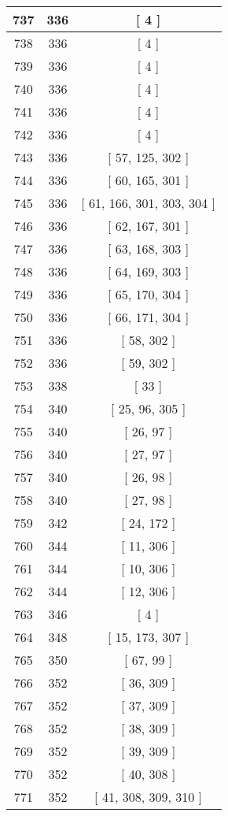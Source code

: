 \begin{center}
\begin{longtable}[H]{|| c c c ||}
\hline
737 & 336 & [ 4 ] \\ 
\hline
738 & 336 & [ 4 ] \\ 
\hline
739 & 336 & [ 4 ] \\ 
\hline
740 & 336 & [ 4 ] \\ 
\hline
741 & 336 & [ 4 ] \\ 
\hline
742 & 336 & [ 4 ] \\ 
\hline
743 & 336 & [ 57, 125, 302 ] \\ 
\hline
744 & 336 & [ 60, 165, 301 ] \\ 
\hline
745 & 336 & [ 61, 166, 301, 303, 304 ] \\ 
\hline
746 & 336 & [ 62, 167, 301 ] \\ 
\hline
747 & 336 & [ 63, 168, 303 ] \\ 
\hline
748 & 336 & [ 64, 169, 303 ] \\ 
\hline
749 & 336 & [ 65, 170, 304 ] \\ 
\hline
750 & 336 & [ 66, 171, 304 ] \\ 
\hline
751 & 336 & [ 58, 302 ] \\ 
\hline
752 & 336 & [ 59, 302 ] \\ 
\hline
753 & 338 & [ 33 ] \\ 
\hline
754 & 340 & [ 25, 96, 305 ] \\ 
\hline
755 & 340 & [ 26, 97 ] \\ 
\hline
756 & 340 & [ 27, 97 ] \\ 
\hline
757 & 340 & [ 26, 98 ] \\ 
\hline
758 & 340 & [ 27, 98 ] \\ 
\hline
759 & 342 & [ 24, 172 ] \\ 
\hline
760 & 344 & [ 11, 306 ] \\ 
\hline
761 & 344 & [ 10, 306 ] \\ 
\hline
762 & 344 & [ 12, 306 ] \\ 
\hline
763 & 346 & [ 4 ] \\ 
\hline
764 & 348 & [ 15, 173, 307 ] \\ 
\hline
765 & 350 & [ 67, 99 ] \\ 
\hline
766 & 352 & [ 36, 309 ] \\ 
\hline
767 & 352 & [ 37, 309 ] \\ 
\hline
768 & 352 & [ 38, 309 ] \\ 
\hline
769 & 352 & [ 39, 309 ] \\ 
\hline
770 & 352 & [ 40, 308 ] \\ 
\hline
771 & 352 & [ 41, 308, 309, 310 ] \\ 

\end{longtable}
\end{center}
